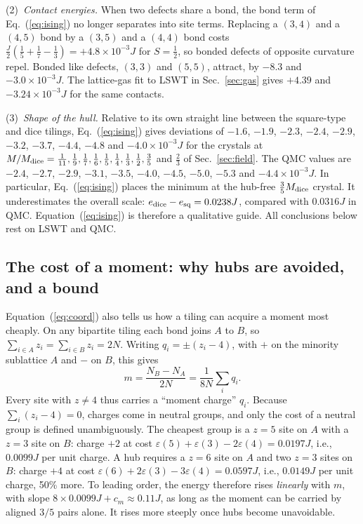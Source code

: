 \documentclass[prb,twocolumn,amsmath,amssymb,floatfix]{revtex4-2}
\newcommand{\Md}{M_{\rm dice}}
\newcommand{\eps}{\varepsilon}
\begin{document}
(2)~\emph{Contact energies.} When two defects share a bond, the bond term of Eq.~(\ref{eq:ising}) no longer separates into site terms. Replacing a $(3,4)$ and a $(4,5)$ bond by a $(3,5)$ and a $(4,4)$ bond costs $\frac J2(\frac15+\frac17-\frac13)=+4.8\times10^{-3}J$ for $S=\frac12$, so bonded defects of opposite curvature repel. Bonded like defects, $(3,3)$ and $(5,5)$, attract, by $-8.3$ and $-3.0\times10^{-3}J$. The lattice-gas fit to LSWT in Sec.~\ref{sec:gas} gives $+4.39$ and $-3.24\times10^{-3}J$ for the same contacts.

(3)~\emph{Shape of the hull.} Relative to its own straight line between the square-type and dice tilings, Eq.~(\ref{eq:ising}) gives deviations of $-1.6$, $-1.9$, $-2.3$, $-2.4$, $-2.9$, $-3.2$, $-3.7$, $-4.4$, $-4.8$ and $-4.0\times10^{-3}J$ for the crystals at $M/\Md=\frac1{11},\frac19,\frac17,\frac16,\frac15,\frac14,\frac13,\frac12,\frac35$ and $\frac23$ of Sec.~\ref{sec:field}. The QMC values are $-2.4$, $-2.7$, $-2.9$, $-3.1$, $-3.5$, $-4.0$, $-4.5$, $-5.0$, $-5.3$ and $-4.4\times10^{-3}J$. In particular, Eq.~(\ref{eq:ising}) places the minimum at the hub-free $\frac35\Md$ crystal. It underestimates the overall scale: $e_{\rm dice}-e_{\rm sq}=0.0238J$, compared with $0.0316J$ in QMC. Equation~(\ref{eq:ising}) is therefore a qualitative guide. All conclusions below rest on LSWT and QMC.



\subsection{The cost of a moment: why hubs are avoided, and a bound}\label{sec:cost}

Equation~(\ref{eq:coord}) also tells us how a tiling can acquire a moment most cheaply. On any bipartite tiling each bond joins $A$ to $B$, so $\sum_{i\in A}z_i=\sum_{i\in B}z_i=2N$. Writing $q_i=\pm(z_i-4)$, with $+$ on the minority sublattice $A$ and $-$ on $B$, this gives
\begin{equation}
m=\frac{N_B-N_A}{2N}=\frac1{8N}\sum_i q_i .
\label{eq:charge}
\end{equation}
Every site with $z\ne4$ thus carries a ``moment charge'' $q_i$. Because $\sum_i(z_i-4)=0$, charges come in neutral groups, and only the cost of a neutral group is defined unambiguously. The cheapest group is a $z=5$ site on $A$ with a $z=3$ site on $B$: charge $+2$ at cost $\eps(5)+\eps(3)-2\eps(4)=0.0197J$, i.e., $0.0099J$ per unit charge. A hub requires a $z=6$ site on $A$ and two $z=3$ sites on $B$: charge $+4$ at cost $\eps(6)+2\eps(3)-3\eps(4)=0.0597J$, i.e., $0.0149J$ per unit charge, 50\% more. To leading order, the energy therefore rises \emph{linearly} with $m$, with slope $8\times0.0099J+c_m\approx0.11J$, as long as the moment can be carried by aligned $3/5$ pairs alone. It rises more steeply once hubs become unavoidable.
\end{document}

